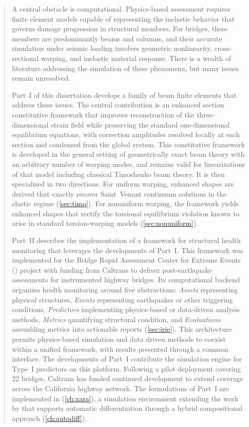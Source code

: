 \begin{abstract}
A central obstacle is computational. 
Physics-based assessment requires finite element models capable of representing the inelastic behavior that governs damage progression in structural members.
For bridges, these members are predominantly beams and columns, and their accurate simulation under seismic loading involves geometric nonlinearity, cross-sectional warping, and inelastic material response.
There is a wealth of literature addressing the simulation of these phenomena, but many issues remain unresolved. 


Part~I of this dissertation develops a family of beam finite elements that address these issues. 
The central contribution is an enhanced section constitutive framework that improves reconstruction of the three-dimensional strain field while preserving the standard one-dimensional equilibrium equations, with correction amplitudes resolved locally at each section and condensed from the global system.
This constitutive framework is developed in the general setting of geometrically exact beam theory with an arbitrary number of warping modes, and remains valid for linearizations of that model including classical Timoshenko beam theory.
It is then specialized in two directions.
For uniform warping, enhanced shapes are derived that exactly recover Saint~Venant continuum solutions in the elastic regime (\cref{sec:timo}). 
For nonuniform warping, the framework yields enhanced shapes that rectify the torsional equilibrium violation known to arise in standard torsion-warping models (\cref{sec:nonuniform}).


Part~II describes the implementation of a framework for structural health monitoring that leverages the developments of Part~I. 
This framework was implemented for the Bridge Rapid Assessment Center for Extreme Events (\BRACE{}) project with funding from Caltrans to deliver post-earthquake assessments for instrumented highway bridges.
Its computational backend organizes health monitoring around five abstractions: \emph{Assets} representing physical structures, \emph{Events} representing earthquakes or other triggering conditions, \emph{Predictors} implementing physics-based or data-driven analysis methods, \emph{Metrics} quantifying structural condition, and \emph{Evaluations} assembling metrics into actionable reports (\cref{sec:irie}). 
This architecture permits physics-based simulation and data driven methods to coexist within a unified framework, with results presented through a common interface.
The developments of Part~I contribute the simulation engine for Type~I predictors on this platform.
Following a pilot deployment covering 22 bridges, Caltrans has funded continued development to extend coverage across the California highway network. 
The formulations of Part~I are implemented in \Xara{} (\cref{ch:xara}), a simulation environment extending the work by \cite{mckenna1997object} that supports automatic differentiation through a hybrid compositional approach (\cref{ch:autodiff}).




\end{abstract}

